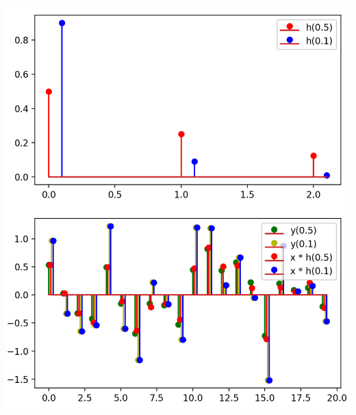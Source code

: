 \begin{listing}
    \noindent
    \begin{minipage}{0.49\textwidth}
        \strut\vspace*{-\baselineskip}\newline
        \inputminted[firstline=5,lastline=33]{python3}{code/exp_mean.py}
    \end{minipage}%
    \begin{minipage}{0.49\textwidth}
        \strut\vspace*{-\baselineskip}\newline
        \includegraphics[width=\textwidth]{code/exp_mean.png}
    \end{minipage}
    \label{py:exp_mean}
\end{listing}
